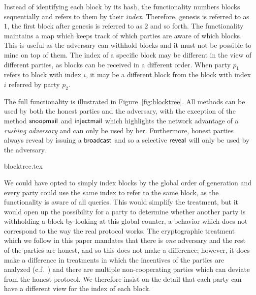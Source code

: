 Instead of identifying each block by its hash, the functionality numbers blocks
sequentially and refers to them by their \emph{index}. Therefore, genesis is
referred to as $1$, the first block after genesis is referred to as $2$ and so
forth. The functionality maintains a map which keeps track of which parties are
aware of which blocks. This is useful as the adversary can withhold blocks and
it must not be possible to mine on top of them. The index of a specific block
may be different in the view of different parties, as blocks can be received in
a different order. When party $p_1$ refers to block with index $i$, it may be a
different block from the block with index $i$ referred by party $p_2$.

The full functionality is illustrated in Figure~\ref{fig:blocktree}. All methods
can be used by both the honest parties and the adversary, with the exception of
the method $\textsf{snoopmail}$ and $\textsf{injectmail}$ which highlights the network advantage
of a \emph{rushing adversary} and can only be used by her. Furthermore, honest
parties always reveal by issuing a $\textsf{broadcast}$ and so a selective $\textsf{reveal}$
will only be used by the adversary.

{blocktree.tex}

\begin{remark}
We could have opted to simply index blocks by the global order of generation and
every party could use the same index to refer to the same block, as the
functionality is aware of all queries. This would simplify the treatment, but it
would open up the possibility for a party to determine whether another party is
withholding a block by looking at this global counter, a behavior which does not
correspond to the way the real protocol works. The cryptographic treatment which
we follow in this paper mandates that there is \emph{one} adversary and the rest
of the parties are honest, and so this does not make a difference; however, it
does make a difference in treatments in which the incentives of the parties are
analyzed (c.f.~\cite{C:KRDO17}) and there are multiple non-cooperating parties
which can deviate from the honest protocol. We therefore insist on the detail
that each party can have a different view for the index of each block.
\end{remark}

